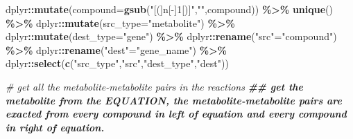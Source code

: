 \documentclass[
]{book}
\newenvironment{Shaded}{\begin{snugshade}}{\end{snugshade}}
\newcommand{\AttributeTok}[1]{\textcolor[rgb]{0.13,0.29,0.53}{#1}}
\newcommand{\CommentTok}[1]{\textcolor[rgb]{0.56,0.35,0.01}{\textit{#1}}}
\newcommand{\DocumentationTok}[1]{\textcolor[rgb]{0.56,0.35,0.01}{\textbf{\textit{#1}}}}
\newcommand{\FunctionTok}[1]{\textcolor[rgb]{0.13,0.29,0.53}{\textbf{#1}}}
\newcommand{\NormalTok}[1]{#1}
\newcommand{\OtherTok}[1]{\textcolor[rgb]{0.56,0.35,0.01}{#1}}
\newcommand{\SpecialCharTok}[1]{\textcolor[rgb]{0.81,0.36,0.00}{\textbf{#1}}}
\newcommand{\StringTok}[1]{\textcolor[rgb]{0.31,0.60,0.02}{#1}}
\begin{document}
\begin{Shaded}
\begin{Highlighting}[]
\NormalTok{  dplyr}\SpecialCharTok{::}\FunctionTok{mutate}\NormalTok{(}\AttributeTok{compound=}\FunctionTok{gsub}\NormalTok{(}\StringTok{"[(]n[{-}]1[)]"}\NormalTok{,}\StringTok{""}\NormalTok{,compound)) }\SpecialCharTok{\%\textgreater{}\%}
  \FunctionTok{unique}\NormalTok{() }\SpecialCharTok{\%\textgreater{}\%}
\NormalTok{  dplyr}\SpecialCharTok{::}\FunctionTok{mutate}\NormalTok{(}\AttributeTok{src\_type=}\StringTok{"metabolite"}\NormalTok{) }\SpecialCharTok{\%\textgreater{}\%}
\NormalTok{  dplyr}\SpecialCharTok{::}\FunctionTok{mutate}\NormalTok{(}\AttributeTok{dest\_type=}\StringTok{"gene"}\NormalTok{) }\SpecialCharTok{\%\textgreater{}\%}
\NormalTok{  dplyr}\SpecialCharTok{::}\FunctionTok{rename}\NormalTok{(}\StringTok{"src"}\OtherTok{=}\StringTok{"compound"}\NormalTok{) }\SpecialCharTok{\%\textgreater{}\%}
\NormalTok{  dplyr}\SpecialCharTok{::}\FunctionTok{rename}\NormalTok{(}\StringTok{"dest"}\OtherTok{=}\StringTok{"gene\_name"}\NormalTok{) }\SpecialCharTok{\%\textgreater{}\%}
\NormalTok{  dplyr}\SpecialCharTok{::}\FunctionTok{select}\NormalTok{(}\FunctionTok{c}\NormalTok{(}\StringTok{"src\_type"}\NormalTok{,}\StringTok{"src"}\NormalTok{,}\StringTok{"dest\_type"}\NormalTok{,}\StringTok{"dest"}\NormalTok{))}

\CommentTok{\# get all the metabolite{-}metabolite pairs in the reactions}
\DocumentationTok{\#\# get the metabolite from the EQUATION, the metabolite{-}metabolite pairs are exacted from every compound in left of equation and every compound in right of equation.}


\end{Highlighting}
\end{Shaded}
\end{document}
